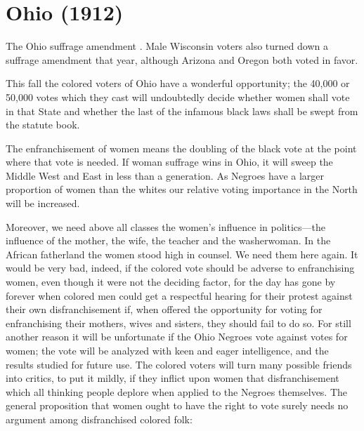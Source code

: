\documentclass[letterpaper,10pt,english]{jupyterBook}
\begin{document}
\section{Ohio (1912)}
\label{\detokenize{Volumes/04/04/ohio:ohio-1912}}\label{\detokenize{Volumes/04/04/ohio::doc}}
\begin{sphinxShadowBox}
\sphinxstylesidebartitle{}

\sphinxAtStartPar
The Ohio suffrage amendment . Male Wisconsin voters also turned down a suffrage amendment that year, although Arizona and Oregon both voted in favor.
\end{sphinxShadowBox}

\sphinxAtStartPar
This fall the colored voters of Ohio have a wonderful opportunity; the 40,000 or 50,000 votes which they cast will undoubtedly decide whether women shall vote in that State and whether the last of the infamous black laws shall be swept from the statute book.

\sphinxAtStartPar
The enfranchisement of women means the doubling of the black vote at the point where that vote is needed. If woman suffrage wins in Ohio, it will sweep the Middle West and East in less than a generation. As Negroes have a larger proportion of women than the whites our relative voting importance in the North will be increased.

\sphinxAtStartPar
Moreover, we need above all classes the women’s influence in politics—the influence of the mother, the wife, the teacher and the washerwoman. In the African fatherland the women stood high in counsel. We need them here again. It would be very bad, indeed, if the colored vote should be adverse to enfranchising women, even though it were not the deciding factor, for the day has gone by forever when colored men could get a respectful hearing for their protest against their own disfranchisement if, when offered the opportunity for voting for enfranchising their mothers, wives and sisters, they should fail to do so. For still another reason it will be unfortunate if the Ohio Negroes vote against votes for women; the vote will be analyzed with keen and eager intelligence, and the results studied for future use. The colored voters will turn many possible friends into critics, to put it mildly, if they inflict upon women that disfranchisement which all thinking people deplore when applied to the Negroes themselves. The general proposition that women ought to have the right to vote surely needs no argument among disfranchised colored folk:
\end{document}
